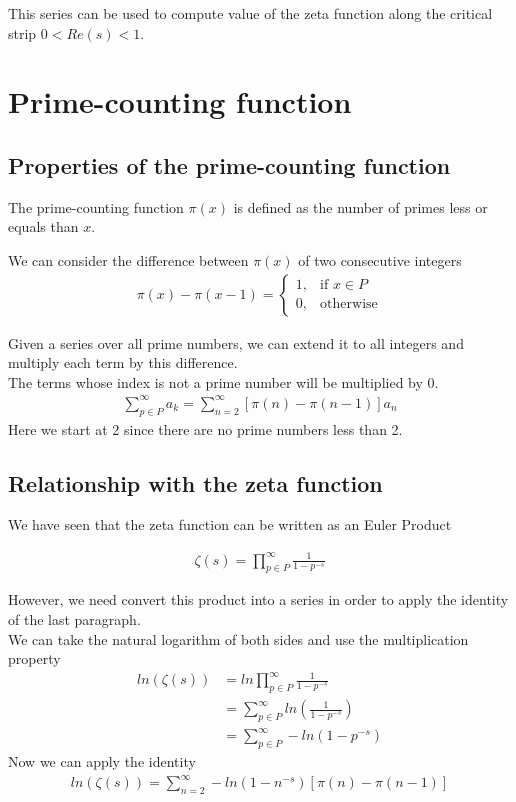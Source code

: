 \documentclass{article}
\begin{document}
This series can be used to compute value of the zeta function along the critical strip $0<Re(s)<1$.

\pagebreak

\section{Prime-counting function}

\subsection{Properties of the prime-counting function}

The prime-counting function $\pi (x)$ is defined as the number of primes less or equals than $x$.

We can consider the difference between $\pi (x)$ of two consecutive integers
\begin{align*}
    \pi (x)-\pi (x-1)= 
    \begin{cases}
        1,& \text{if } x\in P
        \\
        0,& \text{otherwise}
    \end{cases}
\end{align*}

Given a series over all prime numbers, we can extend it to all integers and multiply each term by this difference.
\\
The terms whose index is not a prime number will be multiplied by 0.
\begin{align*}
    \sum_{p\in P}^{\infty}a_k=\sum_{n=2}^{\infty}\left[\pi (n) - \pi (n-1)\right]a_n
\end{align*}
Here we start at 2 since there are no prime numbers less than 2.

\subsection{Relationship with the zeta function}

We have seen that the zeta function can be written as an Euler Product

\begin{align*}
    \zeta (s)=\prod_{p\in P}^{\infty}\frac{1}{1-p^{-s}}
\end{align*}

However, we need convert this product into a series in order to apply the identity of the last paragraph.
\\
We can take the natural logarithm of both sides and use the multiplication property
\begin{align*}
    ln\left(\zeta (s)\right)&=ln\prod_{p\in P}^{\infty}\frac{1}{1-p^{-s}}
    \\
    &=\sum_{p\in P}^{\infty}ln\left(\frac{1}{1-p^{-s}}\right)
    \\
    &=\sum_{p\in P}^{\infty}-ln\left(1-p^{-s}\right)
\end{align*}
Now we can apply the identity
\begin{align*}
    ln\left(\zeta (s)\right)=\sum_{n=2}^{\infty}-ln\left(1-n^{-s}\right)\left[\pi (n) - \pi (n-1)\right]
\end{align*}
\end{document}
